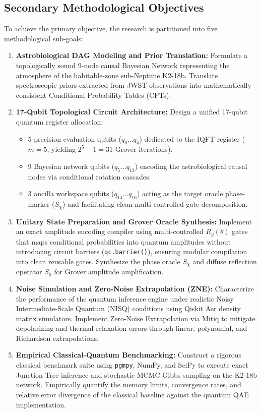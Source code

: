 \subsection{Secondary Methodological Objectives}
To achieve the primary objective, the research is partitioned into five methodological sub-goals:
\begin{enumerate}
    \item \textbf{Astrobiological DAG Modeling and Prior Translation:} Formulate a topologically sound 9-node causal Bayesian Network representing the atmosphere of the habitable-zone sub-Neptune K2-18b. Translate spectroscopic priors extracted from JWST observations \cite{madhusudhan2023} into mathematically consistent Conditional Probability Tables (CPTs).
    \item \textbf{17-Qubit Topological Circuit Architecture:} Design a unified 17-qubit quantum register allocation:
    \begin{itemize}
        \item 5 precision evaluation qubits ($q_0 \dots q_4$) dedicated to the IQFT register ($m=5$, yielding $2^5 - 1 = 31$ Grover iterations).
        \item 9 Bayesian network qubits ($q_5 \dots q_{13}$) encoding the astrobiological causal nodes via conditional rotation cascades.
        \item 3 ancilla workspace qubits ($q_{14} \dots q_{16}$) acting as the target oracle phase-marker ($S_\chi$) and facilitating clean multi-controlled gate decomposition.
    \end{itemize}
    \item \textbf{Unitary State Preparation and Grover Oracle Synthesis:} Implement an exact amplitude encoding compiler using multi-controlled $R_y(\theta)$ gates that maps conditional probabilities into quantum amplitudes without introducing circuit barriers (\texttt{qc.barrier()}), ensuring modular compilation into clean reusable gates. Synthesize the phase oracle $S_\chi$ and diffuse reflection operator $S_0$ for Grover amplitude amplification.
    \item \textbf{Noise Simulation and Zero-Noise Extrapolation (ZNE):} Characterize the performance of the quantum inference engine under realistic Noisy Intermediate-Scale Quantum (NISQ) conditions using Qiskit Aer density matrix simulators. Implement Zero-Noise Extrapolation via Mitiq to mitigate depolarizing and thermal relaxation errors through linear, polynomial, and Richardson extrapolations.
    \item \textbf{Empirical Classical-Quantum Benchmarking:} Construct a rigorous classical benchmark suite using \texttt{pgmpy}, NumPy, and SciPy to execute exact Junction Tree inference and stochastic MCMC Gibbs sampling on the K2-18b network. Empirically quantify the memory limits, convergence rates, and relative error divergence of the classical baseline against the quantum QAE implementation.
\end{enumerate}

